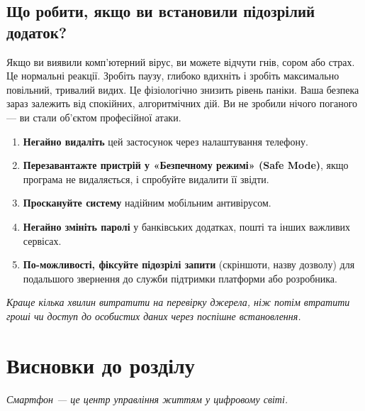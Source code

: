 \newpage

\subsection*{Що робити, якщо ви встановили підозрілий додаток?}

Якщо ви виявили комп'ютерний вірус, ви можете відчути гнів, сором або страх. Це нормальні реакції. Зробіть паузу, глибоко вдихніть і зробіть максимально повільний, тривалий видих. Це фізіологічно знизить рівень паніки. Ваша безпека зараз залежить від спокійних, алгоритмічних дій. Ви не зробили нічого поганого — ви стали об’єктом професійної атаки.



\begin{enumerate}
    \item \textbf{Негайно видаліть} цей застосунок через налаштування телефону.
    
    \item \textbf{Перезавантажте пристрій у «Безпечному режимі» (Safe Mode)}, якщо програма не видаляється, і спробуйте видалити її звідти.
    \item \textbf{Проскануйте систему} надійним мобільним антивірусом.
    \item \textbf{Негайно змініть паролі} у банківських додатках, пошті та інших важливих сервісах.
    
    \item \textbf{По-можливості, фіксуйте підозрілі запити} (скріншоти, назву дозволу) для подальшого звернення до служби підтримки платформи або розробника.
\end{enumerate}

\vspace{0.3cm}
\textit{Краще кілька хвилин витратити на перевірку джерела, ніж потім втратити гроші чи доступ до особистих даних через поспішне встановлення.}


\newpage

\section*{Висновки до розділу} 

\begin{center}
    \textit{Смартфон — це центр управління життям у цифровому світі.}
\end{center}

